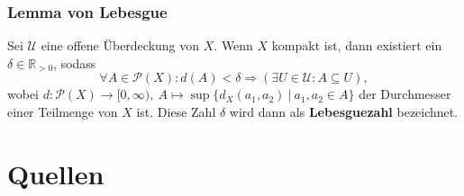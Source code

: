 \documentclass[12pt, aspectratio=169]{beamer}
\newcommand{\R}[0]{\mathbb{R}}
\begin{document}
\begin{frame} \frametitle{Lemma von Lebesgue}
    \begin{lemma}
        Sei $\mathcal{U}$ eine offene Überdeckung von $X$. Wenn $X$ kompakt ist, dann existiert ein $\delta \in \R_{>0}$, sodass
        \begin{equation*}
          \forall A \in \mathcal{P}(X)\colon d(A) < \delta \Rightarrow (\exists U \in \mathcal{U}\colon A \subseteq U),
        \end{equation*}
        wobei $d\colon \mathcal{P}(X) \to [0, \infty), \: A \mapsto \sup \{ d_X(a_1, a_2) \: | \: a_1,a_2\in A \}$ der Durchmesser einer Teilmenge von $X$ ist.
        Diese Zahl $\delta$ wird dann als \textbf{Lebesguezahl} bezeichnet.
    \end{lemma}
\end{frame}

\section{Quellen}
\begin{frame}
    \nocite{*}
	\hfill
    
    
\end{frame}
\end{document}
